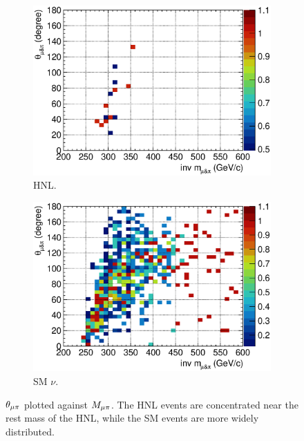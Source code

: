        \begin{figure}[!htb]
           \centering
           \begin{subfigure}{\dbfigwid\textwidth}
                \includegraphics[width=\textwidth]{figures/hnl/hnl_sfgmu_mpinvm_colnor_vs_mpang_hist2d_al9_300.eps}
                \caption{HNL.}
                \label{fig:hnl-mmupi}
           \end{subfigure}
           \begin{subfigure}{\dbfigwid\textwidth}
                \includegraphics[width=\textwidth]{figures/hnl/hnl_sfgmu_mpinvm_colnor_vs_mpang_hist2d_al9_SM.eps}
                \caption{SM $\nu$.}
                \label{fig:sm-mmupi}
           \end{subfigure}
           \caption{$\theta_{\mu\pi}$ plotted against $M_{\mu\pi}$. The HNL events are concentrated near the rest mass of the HNL, while the SM events are more widely distributed.}
           \label{fig:mmupi-mupiang}
        \end{figure}

